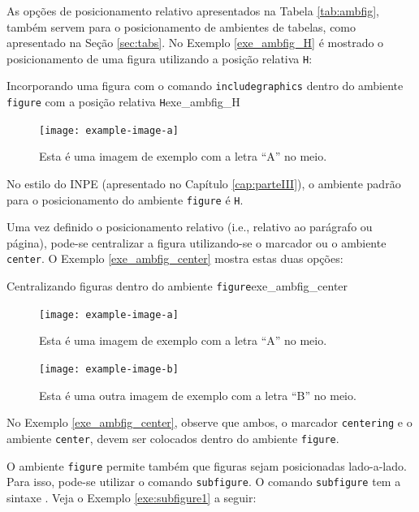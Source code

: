 As opções de posicionamento relativo apresentados na Tabela \ref{tab:ambfig}, também servem para o posicionamento de ambientes de tabelas, como apresentado na Seção \ref{sec:tabs}. No Exemplo \ref{exe_ambfig_H} é mostrado o posicionamento de uma figura utilizando a posição relativa {\tt H}:

\begin{texexptitled}[breakable,enhanced,middle=2mm]{Incorporando uma figura com o comando {\tt includegraphics} dentro do ambiente {\tt figure} com a posição relativa {\tt H}}{exe_ambfig_H}
\lipsum[1]
\begin{figure}[H]
    \texttt{[image: example-image-a]}
    \caption{Esta é uma imagem de exemplo com a letra ``A'' no meio.}
\end{figure}
\lipsum[2]
\end{texexptitled}

\begin{marker}
No estilo do INPE (apresentado no Capítulo \ref{cap:parteIII}), o ambiente padrão para o posicionamento do ambiente {\tt figure} é {\tt H}.
\end{marker}

Uma vez definido o posicionamento relativo (i.e., relativo ao parágrafo ou página), pode-se centralizar a figura utilizando-se o marcador \texttt{\centering} ou o ambiente {\tt center}. O Exemplo \ref{exe_ambfig_center} mostra estas duas opções:

\begin{texexptitled}[breakable,enhanced,middle=2mm]{Centralizando figuras dentro do ambiente {\tt figure}}{exe_ambfig_center}
\lipsum[1]
\begin{figure}[H]
\centering
\texttt{[image: example-image-a]}
\caption{Esta é uma imagem de exemplo com a letra ``A'' no meio.}
\end{figure}
\lipsum[2]
\begin{figure}[H]
    \begin{center}
        \texttt{[image: example-image-b]}
        \caption{Esta é uma outra imagem de exemplo com a letra ``B'' no meio.}
    \end{center}
\end{figure}
\end{texexptitled}

No Exemplo \ref{exe_ambfig_center}, observe que ambos, o marcador \texttt{centering} e o ambiente {\tt center}, devem ser colocados dentro do ambiente {\tt figure}.

O ambiente {\tt figure} permite também que figuras sejam posicionadas lado-a-lado. Para isso, pode-se utilizar o comando {\tt subfigure}. O comando {\tt subfigure} tem a sintaxe \texttt{\subfigure[]{}}. Veja o Exemplo \ref{exe:subfigure1} a seguir:

